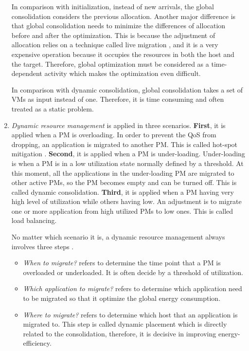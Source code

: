 \begin{enumerate}
	In comparison with initialization, instead of new arrivals, the global consolidation considers the previous allocation. Another major difference is that global consolidation needs to minimize the differences of allocation before and after the optimization. This is because the adjustment of allocation relies on a technique called live migration \cite{Clark:2005uda}, and it is a very expensive operation because it occupies the resources in both the host and the target. Therefore, global optimization must be considered as a time-dependent activity which makes the optimization even difficult.

In comparison with dynamic consolidation, global consolidation takes a set of VMs as input instead of one. Therefore, it is time consuming and often treated as a static problem.
	\item \emph{Dynamic resource management} 
 	is applied in three scenarios. \textbf{First},  it is applied when a PM is overloading. In order to prevent the QoS from dropping, an application is migrated to another PM. This is called hot-spot mitigation \cite{Mishra:2012kx}. \textbf{Second}, it is applied when a PM is under-loading. Under-loading is when a PM is in a low utilization state normally defined by a threshold. At this moment, all the applications in the under-loading PM are migrated to other active PMs, so the PM becomes empty and can be turned off. This is called dynamic consolidation. \textbf{Third}, it is applied when a PM having very high level of utilization while others having low. An adjustment is to migrate one or more application from high utilized PMs to low ones. This is called load balancing.

	No matter which scenario it is, a dynamic resource management always involves three steps . 
	\begin{itemize}
		\item \emph{When to migrate?} refers to determine the time point that a PM is overloaded or underloaded. It is often decide by a threshold of utilization.
		\item \emph{Which application to migrate?} refers to determine which application need to be migrated so that it optimize the global energy consumption.
		\item \emph{Where to migrate?} refers to determine which host that an application is migrated to. This step is called dynamic placement which is directly related to the consolidation, therefore, it is decisive in improving energy-efficiency. 
	\end{itemize}


\end{enumerate}
